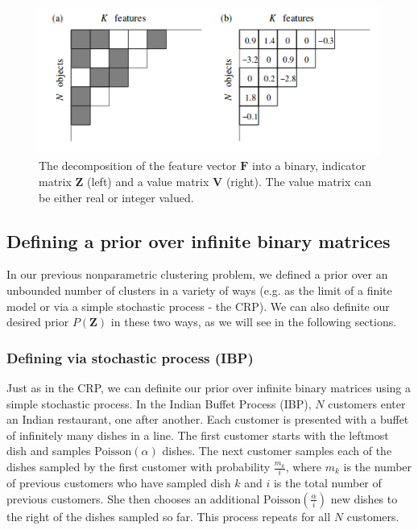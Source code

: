 \documentclass[twoside]{article}
\begin{document}
\begin{figure}[h]
  \centering
    \includegraphics[scale=0.70]{fzv}
  \caption{The decomposition of the feature vector $\mathbf{F}$ into a binary, indicator matrix $\mathbf{Z}$ (left) and a value matrix $\mathbf{V}$ (right). The value matrix can be either real or integer valued.}
  \label{fig:decomp}
\end{figure}

\subsection{Defining a prior over infinite binary matrices}
In our previous nonparametric clustering problem, we defined a prior over an unbounded number of clusters in a variety of ways (e.g. as the limit of a finite model or via a simple stochastic process - the CRP). We can also definite our desired prior $P(\mathbf{Z})$ in these two ways, as we will see in the following sections.

\subsubsection{Defining via stochastic process (IBP)}
Just as in the CRP, we can definite our prior over infinite binary matrices using a simple stochastic process. In the Indian Buffet Process (IBP), $N$ customers enter an Indian restaurant, one after another. Each customer is presented with a buffet of infinitely many dishes in a line. The first customer starts with the leftmost dish and samples $\text{Poisson}(\alpha)$ dishes. The next customer samples each of the dishes sampled by the first customer with probability $\frac{m_k}{i}$, where $m_k$ is the number of previous customers who have sampled dish $k$ and $i$ is the total number of previous customers. She then chooses an additional $\text{Poisson}(\frac{\alpha}{i})$ new dishes to the right of the dishes sampled so far. This process repeats for all $N$ customers.
\end{document}
